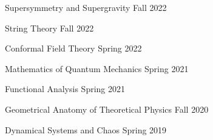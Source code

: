 \begin{multicols}{2}
\columnbreak



\begin{cvcourseworks}

    \cvcoursework
      {Supersymmetry and Supergravity} %
      {} %
      {} %
      {Fall 2022} %
  
    \cvcoursework
      {String Theory} %
      {} %
      {} %
      {Fall 2022} %
  
    \cvcoursework
      {Conformal Field Theory} %
      {} %
      {} %
      {Spring 2022} %
  
    \cvcoursework
      {Mathematics of Quantum Mechanics} %
      {} %
      {} %
      {Spring 2021} %
  
    \cvcoursework
      {Functional Analysis} %
      {} %
      {} %
      {Spring 2021} %
  
    \cvcoursework
      {Geometrical Anatomy of Theoretical Physics} %
      {} %
      {} %
      {Fall 2020} %
  
    \cvcoursework
      {Dynamical Systems and Chaos} %
      {} %
      {} %
      {Spring 2019} %


\end{cvcourseworks}


\end{multicols}

